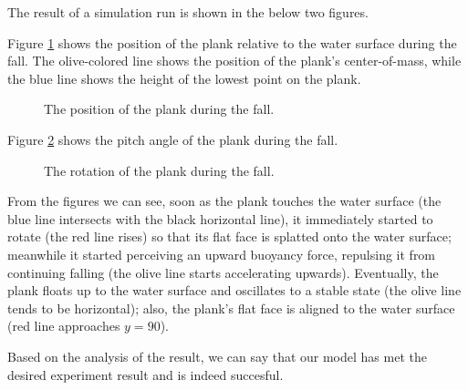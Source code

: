 The result of a simulation run is shown in the below two figures.

Figure \ref{simulation-result-heights} shows the position of the plank relative to the water surface during the fall.
The olive-colored line shows the position of the plank's center-of-mass, while the blue line shows the height of the lowest point on the plank.

\begin{figure}[htb]
	\centering
	\caption{The position of the plank during the fall.}
	\label{simulation-result-heights}
\end{figure}

Figure \ref{simulation-result-rot} shows the pitch angle of the plank during the fall.

\begin{figure}[htb]
	\centering
	\caption{The rotation of the plank during the fall.}
	\label{simulation-result-rot}
\end{figure}

From the figures we can see, soon as the plank touches the water surface (the blue line intersects with the black horizontal line), it immediately started to rotate (the red line rises) so that its flat face is splatted onto the water surface;
meanwhile it started perceiving an upward buoyancy force, repulsing it from continuing falling (the olive line starts accelerating upwards).
Eventually, the plank floats up to the water surface and oscillates to a stable state (the olive line tends to be horizontal);
also, the plank's flat face is aligned to the water surface (red line approaches $y=90$).

Based on the analysis of the result, we can say that our model has met the desired experiment result and is indeed succesful.